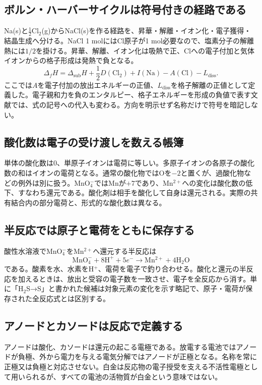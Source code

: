 \subsection{ボルン・ハーバーサイクルは符号付きの経路である}
\label{theory:electrochem:born_haber}
Na(s)と$\tfrac12$Cl$_2$(g)からNaCl(s)を作る経路を、昇華・解離・イオン化・電子獲得・結晶生成へ分ける。NaCl 1 molにはCl原子が1 mol必要なので、塩素分子の解離熱には$1/2$を掛ける。昇華、解離、イオン化は吸熱で正、Clへの電子付加と気体イオンからの格子形成は発熱で負となる。
\[
 \Delta_fH=\Delta_{\mathrm{sub}}H+\frac12D(\mathrm{Cl_2})
 +I(\mathrm{Na})-A(\mathrm{Cl})-L_{\mathrm{diss}} .
\]
ここでは$A$を電子付加の放出エネルギーの正値、$L_{\mathrm{diss}}$を格子解離の正値として定義した。電子親和力を負のエンタルピー、格子エネルギーを形成の負値で表す文献では、式の記号への代入も変わる。方向を明示せず名称だけで符号を暗記しない\cite{openstax_born_haber}。

\subsection{酸化数は電子の受け渡しを数える帳簿}
\label{theory:electrochem:oxidation_number}
単体の酸化数は0、単原子イオンは電荷に等しい。多原子イオンの各原子の酸化数の和はイオンの電荷となる。通常の酸化物ではOを$-2$と置くが、過酸化物などの例外は別に扱う。MnO$_4^-$ではMnが$+7$であり、Mn$^{2+}$への変化は酸化数の低下、すなわち還元である。酸化剤は相手を酸化して自身は還元される。実際の共有結合内の部分電荷と、形式的な酸化数は異なる\cite{mit_redox2014}。

\subsection{半反応では原子と電荷をともに保存する}
\label{theory:electrochem:half_reaction}
酸性水溶液でMnO$_4^-$をMn$^{2+}$へ還元する半反応は
\[
 \mathrm{MnO_4^-}+8\mathrm{H^+}+5e^-
 \longrightarrow\mathrm{Mn^{2+}}+4\mathrm{H_2O}
\]
である。酸素を水、水素をH$^+$、電荷を電子で釣り合わせる。酸化と還元の半反応を加えるときは、放出と受容の電子数を一致させ、電子を全反応から消す。単に「H$_2$S→S」と書かれた候補は対象元素の変化を示す略記で、原子・電荷が保存された全反応式とは区別する。

\subsection{アノードとカソードは反応で定義する}
\label{theory:electrochem:electrodes}
アノードは酸化、カソードは還元の起こる電極である。放電する電池ではアノードが負極、外から電力を与える電気分解ではアノードが正極となる。名称を常に正極又は負極と対応させない。白金は反応物の電子授受を支える不活性電極として用いられるが、すべての電池の活物質が白金という意味ではない\cite{mit_redox2014}。

